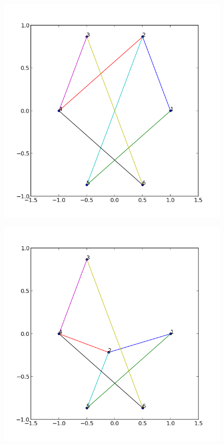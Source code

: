 \documentclass[12pt,a4paper]{article}
\begin{document}
\FloatBarrier 

\begin{figure}
			\begin{minipage}[b]{.24\textwidth}
			\centering
			\includegraphics[width=1.\textwidth]{ex1p0}\\
			\end{minipage}\hfill
			\begin{minipage}[b]{.24\textwidth}
			\centering
			\includegraphics[width=1.\textwidth]{ex1p1}\\

\end{minipage}
\end{figure}
\end{document}
